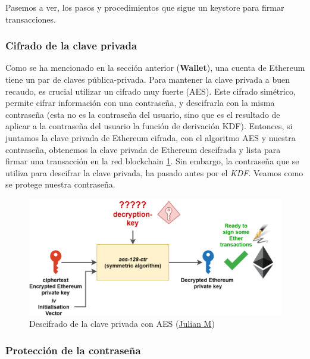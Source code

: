 Pasemos a ver, los pasos y procedimientos que sigue un keystore para firmar transacciones.

\subsubsection{Cifrado de la clave privada}

Como se ha mencionado en la sección anterior (\textbf{Wallet}), una cuenta de Ethereum tiene un par de claves pública-privada. Para mantener la clave privada a buen recaudo, es crucial utilizar un cifrado muy fuerte (AES). Este cifrado simétrico, permite cifrar información con una contraseña, y descifrarla con la misma contraseña (esta no es la contraseña del usuario, sino que es el resultado de aplicar a la contraseña del usuario la función de derivación KDF). Entonces, si juntamos la clave privada de Ethereum cifrada, con el algoritmo AES y nuestra contraseña, obtenemos la clave privada de Ethereum descifrada y lista para firmar una transacción en la red blockchain \ref{fig:keystore_aes}. Sin embargo, la contraseña que se utiliza para descifrar la clave privada, ha pasado antes por el \emph{KDF}. Veamos como se protege nuestra contraseña.

\begin{figure}[h!]
  \centering
  \includegraphics[width=0.8\linewidth]{figs/Desarrollo/Keystore/keystore_AES}
  \caption[Descifrado de la clave privada con AES]{Descifrado de la clave privada con AES (\href{https://julien-maffre.medium.com/what-is-an-ethereum-keystore-file-86c8c5917b97}{Julian M})}
  \label{fig:keystore_aes}
\end{figure}

\subsubsection{Protección de la contraseña}

